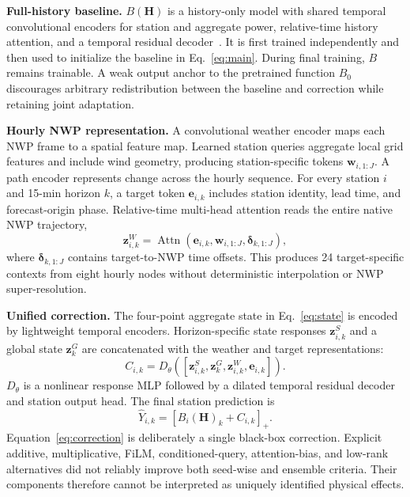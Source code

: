 \documentclass[conference]{IEEEtran}
\begin{document}
\textbf{Full-history baseline.}
$B(\mathbf H)$ is a history-only model with shared temporal convolutional encoders for station and aggregate power, relative-time history attention, and a temporal residual decoder~\cite{ref_tcn}. It is first trained independently and then used to initialize the baseline in Eq.~\eqref{eq:main}. During final training, $B$ remains trainable. A weak output anchor to the pretrained function $B_0$ discourages arbitrary redistribution between the baseline and correction while retaining joint adaptation.

\textbf{Hourly NWP representation.}
A convolutional weather encoder maps each NWP frame to a spatial feature map. Learned station queries aggregate local grid features and include wind geometry, producing station-specific tokens $\mathbf w_{i,1:J}$. A path encoder represents change across the hourly sequence. For every station $i$ and 15-min horizon $k$, a target token $\mathbf e_{i,k}$ includes station identity, lead time, and forecast-origin phase. Relative-time multi-head attention reads the entire native NWP trajectory,
\begin{equation}
 \mathbf z^W_{i,k}=\operatorname{Attn}\!\left(
 \mathbf e_{i,k},\mathbf w_{i,1:J},\boldsymbol\delta_{k,1:J}\right),
 \label{eq:weatherquery}
\end{equation}
where $\boldsymbol\delta_{k,1:J}$ contains target-to-NWP time offsets. This produces 24 target-specific contexts from eight hourly nodes without deterministic interpolation or NWP super-resolution.

\textbf{Unified correction.}
The four-point aggregate state in Eq.~\eqref{eq:state} is encoded by lightweight temporal encoders. Horizon-specific state responses $\mathbf z^S_{i,k}$ and a global state $\mathbf z^G_k$ are concatenated with the weather and target representations:
\begin{equation}
 C_{i,k}=D_{\theta}\!\left(
 [\mathbf z^S_{i,k},\mathbf z^G_k,\mathbf z^W_{i,k},\mathbf e_{i,k}]
 \right).
 \label{eq:correction}
\end{equation}
$D_\theta$ is a nonlinear response MLP followed by a dilated temporal residual decoder and station output head. The final station prediction is
\begin{equation}
 \hat Y_{i,k}=\left[B_i(\mathbf H)_k+C_{i,k}\right]_+.
\end{equation}
Equation~\eqref{eq:correction} is deliberately a single black-box correction. Explicit additive, multiplicative, FiLM, conditioned-query, attention-bias, and low-rank alternatives did not reliably improve both seed-wise and ensemble criteria. Their components therefore cannot be interpreted as uniquely identified physical effects.
\end{document}
